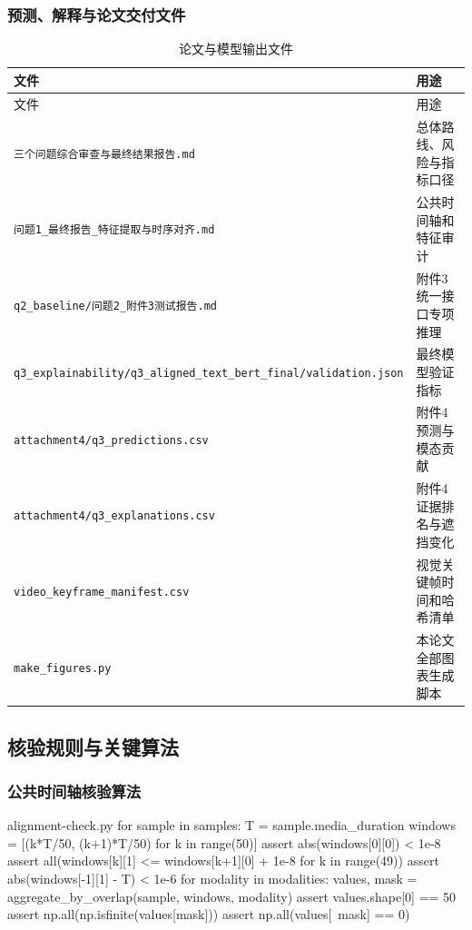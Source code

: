 \documentclass{gmcmthesis}
\newcommand{\code}[1]{\texttt{#1}}
\begin{document}
\begin{appendices}
\subsubsection{预测、解释与论文交付文件}
\begingroup
\footnotesize
\begin{longtable}{C{0.34\textwidth}C{0.50\textwidth}}
\caption{论文与模型输出文件}\label{tab:file_manifest}\\
\toprule 文件 & 用途 \\
\midrule
\endfirsthead
\toprule 文件 & 用途 \\
\midrule
\endhead
\code{三个问题综合审查与最终结果报告.md} & 总体路线、风险与指标口径 \\
\code{问题1\_最终报告\_特征提取与时序对齐.md} & 公共时间轴和特征审计 \\
\code{q2\_baseline/\allowbreak 问题2\_附件3测试报告.md} & 附件3统一接口专项推理 \\
\code{q3\_explainability/\allowbreak q3\_aligned\_text\_bert\_final/\allowbreak validation.json} & 最终模型验证指标 \\
\code{attachment4/\allowbreak q3\_predictions.csv} & 附件4预测与模态贡献 \\
\code{attachment4/\allowbreak q3\_explanations.csv} & 附件4证据排名与遮挡变化 \\
\code{video\_keyframe\_\allowbreak manifest.csv} & 视觉关键帧时间和哈希清单 \\
\code{make\_figures.py} & 本论文全部图表生成脚本 \\
\bottomrule
\end{longtable}
\endgroup
\subsection{核验规则与关键算法}
\subsubsection{公共时间轴核验算法}
\begin{Python}{alignment-check.py}
for sample in samples:
    T = sample.media_duration
    windows = [(k*T/50, (k+1)*T/50) for k in range(50)]
    assert abs(windows[0][0]) < 1e-8
    assert all(windows[k][1] <= windows[k+1][0] + 1e-8
               for k in range(49))
    assert abs(windows[-1][1] - T) < 1e-6
    for modality in modalities:
        values, mask = aggregate_by_overlap(sample, windows, modality)
        assert values.shape[0] == 50
        assert np.all(np.isfinite(values[mask]))
        assert np.all(values[~mask] == 0)
\end{Python}

\end{appendices}
\end{document}
